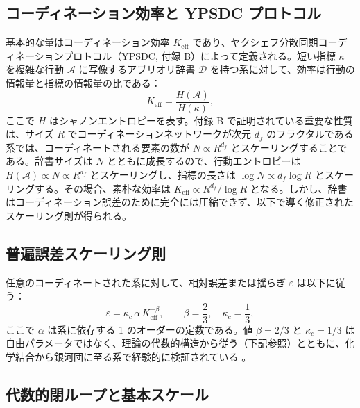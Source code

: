 \documentclass[11pt,a4paper]{article}
\newcommand{\kappac}{\kappa_c}
\newcommand{\Keff}{K_{\mathrm{eff}}}
\newcommand{\betaf}{\beta}
\begin{document}
	\subsection{コーディネーション効率と YPSDC プロトコル}
	
	基本的な量はコーディネーション効率 \(K_{\mathrm{eff}}\) であり、ヤクシェフ分散同期コーディネーションプロトコル（YPSDC, 付録 B）によって定義される。短い指標 \(\kappa\) を複雑な行動 \(\mathcal{A}\) に写像するアプリオリ辞書 \(\mathcal{D}\) を持つ系に対して、効率は行動の情報量と指標の情報量の比である：
	\begin{equation}
		\Keff = \frac{H(\mathcal{A})}{H(\kappa)},
		\label{eq:keff-def}
	\end{equation}
	ここで \(H\) はシャノンエントロピーを表す。付録 B で証明されている重要な性質は、サイズ \(R\) でコーディネーションネットワークが次元 \(d_f\) のフラクタルである系では、コーディネートされる要素の数が \(N \propto R^{d_f}\) とスケーリングすることである。辞書サイズは \(N\) とともに成長するので、行動エントロピーは \(H(\mathcal{A}) \propto N \propto R^{d_f}\) とスケーリングし、指標の長さは \(\log N \propto d_f \log R\) とスケーリングする。その場合、素朴な効率は \(\Keff \propto R^{d_f} / \log R\) となる。しかし、辞書はコーディネーション誤差のために完全には圧縮できず、以下で導く修正されたスケーリング則が得られる。
	
	\subsection{普遍誤差スケーリング則}
	
	任意のコーディネートされた系に対して、相対誤差または揺らぎ \(\varepsilon\) は以下に従う：
	\begin{equation}
		\varepsilon = \kappac \, \alpha \, \Keff^{-\betaf}, \qquad \betaf = \frac{2}{3}, \quad \kappac = \frac{1}{3},
		\label{eq:universal}
	\end{equation}
	ここで \(\alpha\) は系に依存する 1 のオーダーの定数である。値 \(\betaf = 2/3\) と \(\kappac = 1/3\) は自由パラメータではなく、理論の代数的構造から従う（下記参照）とともに、化学結合から銀河団に至る系で経験的に検証されている \cite{AppendixL}。
	
	\subsection{代数的閉ループと基本スケール}
	
\end{document}
